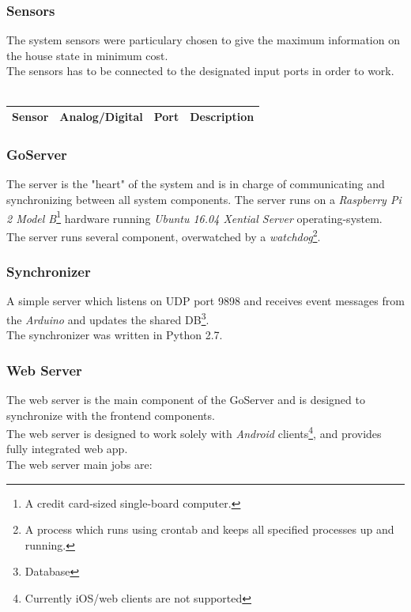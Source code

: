 \documentclass[10pt]{article}
\begin{document}
\subsubsection{Sensors}
The system sensors were particulary chosen to give the maximum information on the house state in minimum cost. \\
The sensors has to be connected to the designated input ports in order to work. \\ \\
\begin{tabular}{| l | l | l | l |}
	\hline
	\textbf{Sensor} & \textbf{Analog/Digital} & \textbf{Port} & \textbf{Description} \\ \hline

\end{tabular}
\subsubsection{GoServer}
The server is the "heart" of the system and is in charge of communicating and synchronizing between all system components.
The server runs on a \emph{Raspberry Pi 2 Model B}\footnote{A credit card-sized single-board computer.} hardware running \emph{Ubuntu 16.04 Xential Server} operating-system. \\
The server runs several component, overwatched by a \emph{watchdog}\footnote{A process which runs using crontab and keeps all specified processes up and running.}. \\
\quad \subsubsection*{Synchronizer}
\quad A simple server which listens on UDP port 9898 and receives event messages from the \emph{Arduino} and updates the shared DB\footnote{Database}. \\
\quad The synchronizer was written in Python 2.7. \\
\quad \subsubsection*{Web Server}
\quad The web server is the main component of the GoServer and is designed to synchronize with the frontend components. \\
\quad The web server is designed to work solely with \emph{Android} clients\footnote{Currently iOS/web clients are not supported}, and provides fully integrated web app. \\
\quad The web server main jobs are:
\end{document}
